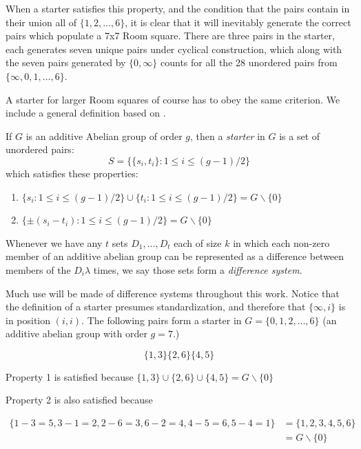 \documentclass[
  11pt,
  a4paper]{book}
\begin{document}
When a starter satisfies this property, and the condition that the pairs
contain in their union all of \(\{1, 2, \ldots, 6\}\), it is clear that
it will inevitably generate the correct pairs which populate a 7x7 Room
square. There are three pairs in the starter, each generates seven
unique pairs under cyclical construction, which along with the seven
pairs generated by \(\{0, \infty\}\) counts for all the 28 unordered
pairs from \(\{\infty, 0, 1, \ldots, 6\}\).

A starter for larger Room squares of course has to obey the same
criterion. We include a general definition based on
\textcite{dinitz_contemporary_1992}.

If \(G\) is an additive Abelian group of order \(g\), then a
\emph{starter} in \(G\) is a set of unordered pairs:
\[S = \{\{s_i, t_i\}:1 \leq i \leq (g - 1)/2\}\] which satisfies these
properties:

\begin{enumerate}
  \item{$\{s_i:1 \leq i \leq (g-1)/2\} \cup \{t_i : 1 \leq i \leq (g-1)/2\} = G \backslash \{0\}$}
  \item{$\{\pm (s_i - t_i ) : 1 \leq i \leq (g-1)/2 \} = G \backslash \{0\}$}
\end{enumerate}

Whenever we have any \(t\) sets \(D_1, \ldots, D_t\) each of size \(k\)
in which each non-zero member of an additive abelian group can be
represented as a difference between members of the \(D_i \lambda\)
times, we say those sets form a \emph{difference system}.

Much use will be made of difference systems throughout this work. Notice
that the definition of a starter presumes standardization, and therefore
that \(\{\infty, i\}\) is in position \((i, i)\). The following pairs
form a starter in \(G = \{0, 1, 2, \ldots, 6\}\) (an additive abelian
group with order \(g = 7\).)

\begin{equation}
\{1,3\} \{2,6\} \{4,5\}
\end{equation}

Property 1 is satisfied because
\(\{1,3\} \cup \{2,6\} \cup \{4,5\} = G \backslash \{0\}\)

Property 2 is also satisfied because

\begin{equation}
\begin{split}
\{1 - 3 = 5, 3 - 1 = 2, 2 - 6 = 3, 6 - 2 = 4, 4 - 5 = 6, 5 - 4 = 1\} &= \{1, 2, 3, 4, 5, 6\} \\
 &= G\backslash \{0\}
\end{split}
\end{equation}
\end{document}
